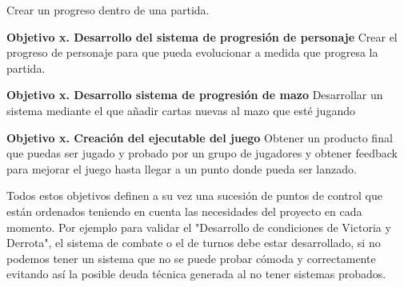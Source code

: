 \begin{description}
Crear un progreso dentro de una partida. 
\item \textbf{Objetivo x. Desarrollo del sistema de progresión de personaje}
Crear el progreso de personaje para que pueda evolucionar a medida que progresa la partida.
\item \textbf{Objetivo x. Desarrollo sistema de progresión de mazo}
Desarrollar un sistema mediante el que añadir cartas nuevas al mazo que esté jugando 
\item \textbf{Objetivo x. Creación del ejecutable del juego}
Obtener un producto final que puedas ser jugado y probado por un grupo de jugadores y obtener feedback para mejorar el juego hasta llegar a un punto donde pueda ser lanzado.
\end{description}

Todos estos objetivos definen a su vez una sucesión de puntos de control que están ordenados teniendo en cuenta las necesidades del proyecto en cada momento. Por ejemplo para validar el "Desarrollo de condiciones de Victoria y Derrota", el sistema de combate o el de turnos debe estar desarrollado, si no podemos tener un sistema que no se puede probar cómoda y correctamente evitando así la posible deuda técnica generada al no tener sistemas probados.